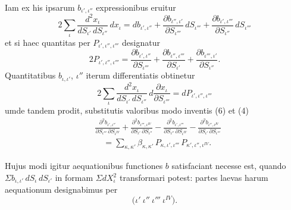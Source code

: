\documentclass[12pt,a4paper]{article}
\begin{document}
Iam ex his ipsarum $b_{\iota',\iota''}$ expressionibus eruitur
\begin{equation}\label{eq:5}
2\sum_{\iota} \frac{d^2 x_{\iota}}{dS_{\iota'}\, dS_{\iota''}}\, dx_{\iota} =
 db_{\iota',\iota''} + \frac{\partial b_{\iota'',\iota'}}{\partial S_{\iota'''}}\, dS_{\iota'''}
 + \frac{\partial b_{\iota',\iota'''}}{\partial S_{\iota''}}\, dS_{\iota'''}
\end{equation}
et si haec quantitas per $P_{\iota',\iota'',\iota'''}$ designatur
\begin{equation}\label{eq:6}
2P_{\iota',\iota'',\iota'''} =
 \frac{\partial b_{\iota',\iota''}}{\partial S_{\iota'''}}
 + \frac{\partial b_{\iota'',\iota'''}}{\partial S_{\iota'}}
 + \frac{\partial b_{\iota''',\iota'}}{\partial S_{\iota''}}.
\end{equation}
Quantitatibus $b_{\iota,\iota'}$, $\iota''$ iterum differentiatis obtinetur
\[
2\sum_{\iota} \frac{d^2 x_{\iota}}{dS_{\iota'}\, dS_{\iota''}}\,
 d\frac{\partial x_{\iota}}{\partial S_{\iota'''}} = dP_{\iota',\iota'',\iota'''}
\]
umde tandem prodit, substitutis valoribus modo inventis (6) et (4)
\begin{equation}\label{eq:I}
\tag{I}
\begin{aligned}
&\frac{\partial^2 b_{\iota',\iota''}}{\partial S_{\iota'''}\,\partial S_{\iota^{IV}}}
+ \frac{\partial^2 b_{\iota''',\iota^{IV}}}{\partial S_{\iota'}\,\partial S_{\iota''}}
- \frac{\partial^2 b_{\iota',\iota'''}}{\partial S_{\iota''}\,\partial S_{\iota^{IV}}}
- \frac{\partial^2 b_{\iota'',\iota^{IV}}}{\partial S_{\iota'}\,\partial S_{\iota'''}} \\
&\quad = \sum_{\kappa,\kappa'} \beta_{\kappa,\kappa'}\,
 P_{\kappa,\iota',\iota'''}\, P_{\kappa',\iota'',\iota^{IV}}.
\end{aligned}
\end{equation}

Hujus modi igitur aequationibus functiones $b$ satisfaciant necesse
est, quando $\Sigma b_{\iota,\iota'}\, dS_{\iota}\, dS_{\iota'}$ in formam
$\Sigma dX_{\iota}^2$ transformari potest: partes laevas harum aequationum
 designabimus per
\[
\bigl(\iota'\ \iota''\ \iota'''\ \iota^{IV}\bigr).
\]
\end{document}
